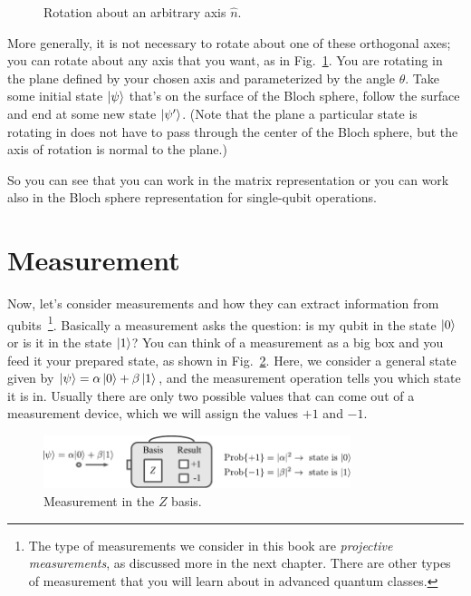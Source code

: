 \begin{figure}[H]
    
    \caption{Rotation about an arbitrary axis $\hat{n}$.}
    
    \label{fig:arb-rot}
\end{figure}

More generally, it is not necessary to rotate about one of these orthogonal axes; you can rotate about any axis that you want, as in Fig.~\ref{fig:arb-rot}. You are rotating in the plane defined by your chosen axis and parameterized by the angle $\theta$. Take some initial state $\left| \psi \right\rangle$ that's on the surface of the Bloch sphere, follow the surface and end at some new state $\left| \psi' \right\rangle$.  (Note that the plane a particular state is rotating in does not have to pass through the center of the Bloch sphere, but the axis of rotation is normal to the plane.) 

So you can see that you can work in the matrix representation or you can work also in the Bloch sphere representation for single-qubit operations.



\section{Measurement}
\label{sec:measurement}

Now, let's consider measurements and how they can extract information from qubits~\footnote{The type of measurements we consider in this book are \emph{projective measurements}, as discussed more in the next chapter. There are other types of measurement that you will learn about in advanced quantum classes.}. Basically a measurement asks the question: is my qubit in the state $\left| 0 \right\rangle$ or is it in the state $\left| 1 \right\rangle$? You can think of a measurement as a big box and you feed it your prepared state, as shown in Fig.~\ref{fig:z-measure}. Here, we consider a general state given by $\left| \psi \right\rangle = \alpha\left| 0 \right\rangle+\beta\left| 1 \right\rangle$, and the measurement operation tells you which state it is in. Usually there are only two possible values that can come out of a measurement device, which we will assign the values $+1$ and $-1$.

\begin{figure}[H]
    \centering
    \includegraphics[width=0.8\textwidth]{lesson2/2-2_measurement_Z.pdf}
    \caption{Measurement in the $Z$ basis.}
    \label{fig:z-measure}
\end{figure}

